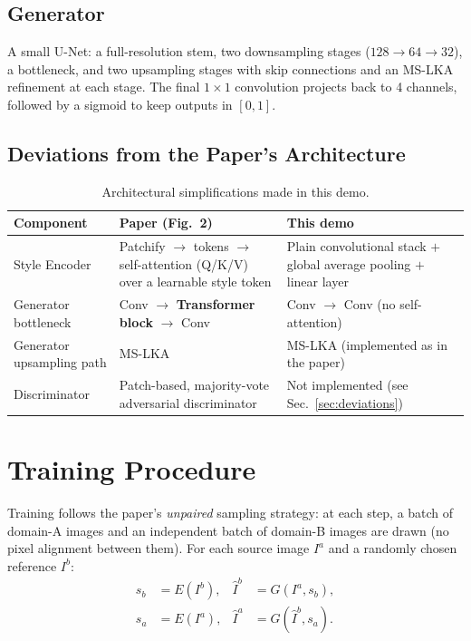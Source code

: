 \documentclass[11pt]{article}
\begin{document}
\subsection{Generator}
A small U-Net: a full-resolution stem, two downsampling stages
($128\!\to\!64\!\to\!32$), a bottleneck, and two upsampling stages with
skip connections and an MS-LKA refinement at each stage. The final
$1\times1$ convolution projects back to 4 channels, followed by a
sigmoid to keep outputs in $[0,1]$.

\subsection{Deviations from the Paper's Architecture}
\label{sec:arch-deviations}
\begin{table}[h]
\centering
\caption{Architectural simplifications made in this demo.}
\begin{tabular}{p{4.2cm}p{5cm}p{5cm}}
\hline
\textbf{Component} & \textbf{Paper (Fig.~2)} & \textbf{This demo} \\
\hline
Style Encoder & Patchify $\to$ tokens $\to$ self-attention
                (Q/K/V) over a learnable style token
              & Plain convolutional stack $+$ global average
                pooling $+$ linear layer \\
Generator bottleneck & Conv $\to$ \textbf{Transformer block}
                        $\to$ Conv
                      & Conv $\to$ Conv (no self-attention) \\
Generator upsampling path & MS-LKA & MS-LKA (implemented as in
                                      the paper) \\
Discriminator & Patch-based, majority-vote adversarial
                discriminator & Not implemented (see
                Sec.~\ref{sec:deviations}) \\
\hline
\end{tabular}
\end{table}

\section{Training Procedure}

Training follows the paper's \emph{unpaired} sampling strategy: at each
step, a batch of domain-A images and an independent batch of domain-B
images are drawn (no pixel alignment between them). For each source
image $I^a$ and a randomly chosen reference $I^b$:
\begin{align}
    s_b &= E(I^b), &
    \hat{I}^b &= G(I^a, s_b), \\
    s_a &= E(I^a), &
    \hat{I}^a &= G(\hat{I}^b, s_a).
\end{align}
\end{document}
